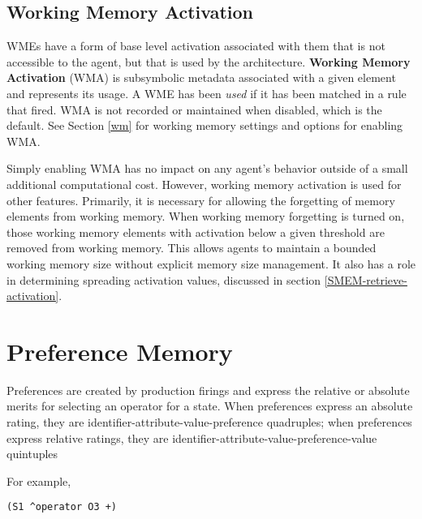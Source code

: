 \subsection{Working Memory Activation}

WMEs have a form of base level activation associated with them that is not accessible to the agent, but that is used by the architecture. \textbf{Working Memory Activation} (WMA) is subsymbolic metadata associated with a given element and represents its usage. A WME has been \textit{used} if it has been matched in a rule that fired. WMA is not recorded or maintained when disabled, which is the default. See Section \ref{wm} for working memory settings and options for enabling WMA.

Simply enabling WMA has no impact on any agent's behavior outside of a small additional computational cost. However, working memory activation is used for other features. Primarily, it is necessary for allowing the forgetting of memory elements from working memory. When working memory forgetting is turned on, those working memory elements with activation below a given threshold are removed from working memory. This allows agents to maintain a bounded working memory size without explicit memory size management. It also has a role in determining spreading activation values, discussed in section \ref{SMEM-retrieve-activation}.


\section{Preference Memory}
\label{SYNTAX-prefmem}

Preferences are created by production firings and express the relative or absolute merits for selecting an operator for a state.  When preferences express an absolute rating, they are identifier-attribute-value-preference quadruples; when preferences express relative ratings, they are identifier-attribute-value-preference-value quintuples

For example,

\begin{verbatim}
(S1 ^operator O3 +)
\end{verbatim}

